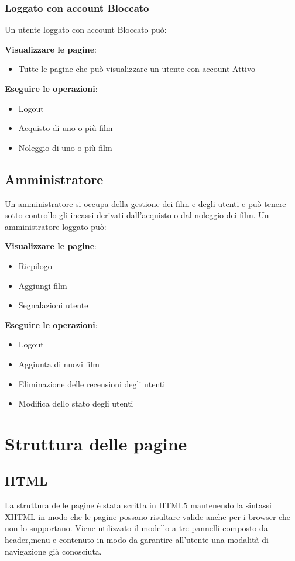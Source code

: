 \documentclass[a4paper]{article}
\begin{document}
    \subsubsection{Loggato con account Bloccato}
    Un utente loggato con account Bloccato pu\`o:

    \noindent\textbf{Visualizzare le pagine}:
    \begin{itemize}
        \item Tutte le pagine che pu\`o visualizzare un utente con account Attivo
    \end{itemize}
    \textbf{Eseguire le operazioni}:
    \begin{itemize}
        \item Logout
        \item Acquisto di uno o pi\`u film
        \item Noleggio di uno o pi\`u film
    \end{itemize}
\subsection{Amministratore}
    Un amministratore si occupa della gestione dei film e degli utenti e pu\`o tenere sotto controllo gli incassi derivati
    dall'acquisto o dal noleggio dei film.
    Un amministratore loggato pu\`o:

\noindent\textbf{Visualizzare le pagine}:
\begin{itemize}
    \item Riepilogo
    \item Aggiungi film
    \item Segnalazioni utente
\end{itemize}
\textbf{Eseguire le operazioni}:
\begin{itemize}
    \item Logout
    \item Aggiunta di nuovi film 
    \item Eliminazione delle recensioni degli utenti
    \item Modifica dello stato degli utenti
\end{itemize}
\section{Struttura delle pagine}
\subsection{HTML}
La struttura delle pagine \`e stata scritta in HTML5 mantenendo la sintassi XHTML in modo che le pagine possano risultare valide anche per i browser che non
lo supportano.
Viene utilizzato il modello a tre pannelli composto da header,menu e contenuto in modo da garantire all'utente una modalit\`a di navigazione
gi\`a conosciuta.
\end{document}
